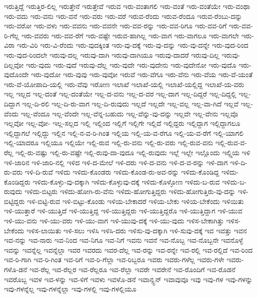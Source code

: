 {ಇರುತ್ತಿದ್ದೆ
ಇರುತ್ತಿರ-ಲಿಲ್ಲ
ಇರುತ್ತೇನೆ
ಇರುತ್ತೇವೆ
ಇರುವ
ಇರು-ವಂತಾಗಲಿ
ಇರು-ವಂತೆ
ಇರು-ವಂತೆಯೇ
ಇರು-ವಂಥಾ
ಇರು-ವದು
ಇರು-ವನು
ಇರು-ವನೆ
ಇರು-ವರು
ಇರು-ವರೆ
ಇರುವ-ರೆಂದು
ಇರುವ-ರೆಂದೂ
ಇರುವ-ರೆಂಬು-ದನ್ನು
ಇರು-ವರೋ
ಇರು-ವಳು
ಇರು-ವವನು
ಇರು-ವವನೇ
ಇರು-ವವ-ರನ್ನು
ಇರು-ವವ-ರಿಗೂ
ಇರು-ವವ-ರಿಗೆ
ಇರು-ವವ-ರಿ-ಗೆಲ್ಲ
ಇರು-ವವರು
ಇರು-ವವ-ರೆಗೆ
ಇರು-ವಷ್ಟೇ
ಇರುವ-ಹಾಗಿಲ್ಲ
ಇರು-ವಾಗ
ಇರು-ವಾಗಲೂ
ಇರು-ವಾಗಲೇ
ಇರು-ವಿರಾ
ಇರು-ವಿರಿ
ಇರು-ವಿ-ರೆಂದು
ಇರು-ವುದಕ್ಕಿಂತ
ಇರು-ವು-ದಕ್ಕೆ
ಇರು-ವು-ದನ್ನು
ಇರು-ವು-ದನ್ನೇ
ಇರು-ವುದ-ರಿಂದ
ಇರು-ವುದ-ರಿಂದಲೇ
ಇರುವು-ದಲ್ಲ
ಇರುವು-ದಾಗಿ
ಇರುವು-ದಾಗಿಯೂ
ಇರುವು-ದಾದರೆ
ಇರುವು-ದಿಲ್ಲ
ಇರುವು-ದಿಲ್ಲವೋ
ಇರು-ವುದು
ಇರು-ವುದೆ
ಇರುವು-ದೆಲ್ಲ
ಇರು-ವುದೇ
ಇರು-ವುದೇನು
ಇರು-ವುದೇನೋ
ಇರು-ವುದೊ
ಇರು-ವುದೊಂದೇ
ಇರು-ವುದೋ
ಇರು-ವುವು
ಇರು-ವುವೋ
ಇರುವೆ
ಇರು-ವೆಗೂ
ಇರು-ವೆನು
ಇರು-ವೆಯ
ಇರು-ವೆ-ಯಂತೆ
ಇರು-ವೆ-ಯೋಪಾದಿ-ಯಲ್ಲಿ
ಇರು-ವೆವು
ಇರೋಣ
ಇಲಾಖೆ
ಇಲಾಖೆ-ಯಲ್ಲಿ
ಇಲಾಖೆ-ಯಲ್ಲಿದ್ದ
ಇಲಾಖೆ-ಯ-ವರು
ಇಲ್ಲ
ಇಲ್ಲದ
ಇಲ್ಲ-ದಂತೆ
ಇಲ್ಲ-ದಂತೆಯೇ
ಇಲ್ಲ-ದ-ವನು
ಇಲ್ಲ-ದ-ವರ
ಇಲ್ಲ-ದಾಗ
ಇಲ್ಲ-ದಿದ್ದರೆ
ಇಲ್ಲ-ದಿದ್ದಲ್ಲಿ
ಇಲ್ಲ-ದಿದ್ದಾಗ
ಇಲ್ಲ-ದಿ-ರಲಿ
ಇಲ್ಲ-ದಿ-ರು-ವಾಗ
ಇಲ್ಲ-ದಿ-ರುವುದು
ಇಲ್ಲದೆ
ಇಲ್ಲದೇ
ಇಲ್ಲ-ವಲ್ಲ
ಇಲ್ಲ-ವಾ-ಗಿದೆ
ಇಲ್ಲವೆ
ಇಲ್ಲ-ವೆಂದು
ಇಲ್ಲ-ವೆಂದೂ
ಇಲ್ಲ-ವೆಂದೇ
ಇಲ್ಲ-ವೆನ್ನ-ಬಹುದು
ಇಲ್ಲ-ವೆನ್ನು-ವು-ದನ್ನು
ಇಲ್ಲವೇ
ಇಲ್ಲ-ವೇನು
ಇಲ್ಲವೊ
ಇಲ್ಲವೋ
ಇಲ್ಲ-ವೋ-
ಇಲ್ಲ-ಸಲ್ಲದ
ಇಲ್ಲಿ
ಇಲ್ಲಿಂದ
ಇಲ್ಲಿಗೆ
ಇಲ್ಲಿಗೇ
ಇಲ್ಲಿದೆ
ಇಲ್ಲಿದ್ದರು
ಇಲ್ಲಿದ್ದಾಗ
ಇಲ್ಲಿದ್ದಾಗಲೂ
ಇಲ್ಲಿದ್ದಾಗಲೆ
ಇಲ್ಲಿದ್ದು
ಇಲ್ಲಿನ
ಇಲ್ಲಿ-ನ-ವ-ರಿ-ಗಿಂತ
ಇಲ್ಲಿಯ
ಇಲ್ಲಿ-ಯ-ವ-ರೆಗೂ
ಇಲ್ಲಿ-ಯ-ವ-ರೆಗೆ
ಇಲ್ಲಿ-ಯಾಗಲಿ
ಇಲ್ಲಿ-ಯಾದರೂ
ಇಲ್ಲಿಯೂ
ಇಲ್ಲಿಯೇ
ಇಲ್ಲಿ-ರುವ
ಇಲ್ಲಿ-ರು-ವನು
ಇಲ್ಲಿ-ರು-ವರು
ಇಲ್ಲಿ-ರುವ-ವನು
ಇಲ್ಲಿ-ರುವ-ವ-ರೆಲ್ಲ
ಇಲ್ಲಿ-ರು-ವಷ್ಟು
ಇಲ್ಲಿ-ರು-ವಷ್ಟೇ
ಇಲ್ಲಿ-ರುವು-ದಾ-ವುದೂ
ಇಲ್ಲಿ-ರುವುದು
ಇಲ್ಲೆ
ಇಲ್ಲೇ
ಇಲ್ಲೊಂದು
ಇಲ್ಲ್ಲಿಯ
ಇಳಿ
ಇಳಿ-ಜಾರಿನ
ಇಳಿ-ಜಾರಿ-ನಲ್ಲಿ
ಇಳಿದ
ಇಳಿ-ದ-ಮೇಲೆ
ಇಳಿ-ದರು
ಇಳಿ-ದ-ವನು
ಇಳಿ-ದ-ವ-ರನ್ನು
ಇಳಿ-ದಾಗ
ಇಳಿ-ದಿ-ರು-ವರು
ಇಳಿ-ದಿ-ರುವೆ
ಇಳಿದು
ಇಳಿದು-ಕೊಂಡರು
ಇಳಿದು-ಕೊಂಡ-ರು-ಅವ-ರನ್ನು
ಇಳಿದು-ಕೊಂಡಿದ್ದ
ಇಳಿದು-ಕೊಂಡಿದ್ದರು
ಇಳಿದು-ಕೊಳ್ಳು-ವು-ದಕ್ಕಾಗಿ
ಇಳಿದು-ಕೊಳ್ಳುವು-ದಕ್ಕೆ
ಇಳಿದು-ಕೊಳ್ಳೋಣ
ಇಳಿದು-ಬ-ರುವ
ಇಳಿದು-ಬ-ರುವುದು
ಇಳಿದು-ಬಿಟ್ಟರು
ಇಳಿದು-ಹೋಗಿ-ರು-ವೆನು
ಇಳಿದು-ಹೋಗುತ್ತಿದ್ದರು
ಇಳಿದು-ಹೋಗುತ್ತಿರು-ವು-ದನ್ನು
ಇಳಿ-ಬಿಟ್ಟಿದ್ದರು
ಇಳಿ-ಬಿಟ್ಟಿ-ರುವ
ಇಳಿ-ಬಿಟ್ಟು-ಕೊಂಡು
ಇಳಿಯ-ಬೇಕಾದರೆ
ಇಳಿಯ-ಬೇಕು
ಇಳಿಯ-ಬೇಕೆಂದು
ಇಳಿಯಿತು
ಇಳಿ-ಯುತ್ತಾರೆ
ಇಳಿ-ಯುತ್ತಿದೆ
ಇಳಿ-ಯುತ್ತಿದ್ದ
ಇಳಿ-ಯುತ್ತಿದ್ದರು
ಇಳಿ-ಯುತ್ತಿದ್ದರೊ
ಇಳಿ-ಯುತ್ತಿದ್ದಾಗ
ಇಳಿ-ಯುವ
ಇಳಿ-ಯು-ವನು
ಇಳಿ-ಯು-ವರು
ಇಳಿ-ಯು-ವಾಗ
ಇಳಿ-ಯುವು-ದಕ್ಕೆ
ಇಳಿ-ಯು-ವುದು
ಇಳಿಸ-ಬೇಕಾಗಿತ್ತು
ಇಳಿಸ-ಬೇಕೆಂದು
ಇಳಿಸ-ಲಾಯಿತು
ಇಳಿ-ಸಲು
ಇಳಿಸಿ
ಇಳಿಸಿ-ದರು
ಇಳಿಸು-ವು-ದಕ್ಕಾಗಿ
ಇಳಿ-ಸುವು-ದಕ್ಕೆ
ಇವ
ಇವತ್ತು
ಇವನ
ಇವ-ನನ್ನು
ಇವ-ನಾರು
ಇವ-ನಿಂದ
ಇವ-ನಿಗೂ
ಇವ-ನಿಗೆ
ಇವನು
ಇವನೆ
ಇವ-ನೊಬ್ಬ
ಇವ-ನೊಬ್ಬನೇ
ಇವನೊಳ್ಳೆ
ಇವನ್ನು
ಇವನ್ನೆಲ್ಲ
ಇವನ್ನೆಲ್ಲಾ
ಇವರ
ಇವರದು
ಇವರ-ದೆಲ್ಲ
ಇವ-ರನ್ನು
ಇವ-ರನ್ನೇ
ಇವ-ರಲ್ಲಿ
ಇವ-ರಲ್ಲಿದೆ
ಇವ-ರಿಂದ
ಇವ-ರಿ-ಗಾಗಿ
ಇವ-ರಿ-ಗಿಂತ
ಇವ-ರಿಗೆ
ಇವ-ರಿ-ಗೆಲ್ಲಾ
ಇವ-ರಿಬ್ಬರೂ
ಇವರು
ಇವರು-ಗಳೆಲ್ಲ
ಇವರು-ಗಳೇ
ಇವರು-ಗಳೊ-ಡನೆ
ಇವ-ರೆಲ್ಲ
ಇವ-ರೆಲ್ಲರ
ಇವ-ರೆಲ್ಲರೂ
ಇವ-ರೆಲ್ಲಾ
ಇವರೇ
ಇವರೇನೆ
ಇವ-ರೊಂದಿಗೆ
ಇವ-ರೊಡನೆ
ಇವರೊಬ್ಬ
ಇವಳ
ಇವ-ಳನ್ನು
ಇವ-ಳಿಗೆ
ಇವಳು
ಇವಳೊ-ಡನೆ
ಇವಾನ್ಸ್ಟನ್
ಇವಾವುವೂ
ಇವು
ಇವು-ಗಳ
ಇವು-ಗಳನ್ನು
ಇವು-ಗಳನ್ನೆಲ್ಲ
ಇವು-ಗಳನ್ನೆಲ್ಲಾ
ಇವು-ಗಳಲ್ಲಿ
ಇವು-ಗಳಲ್ಲಿಯೂ
}
